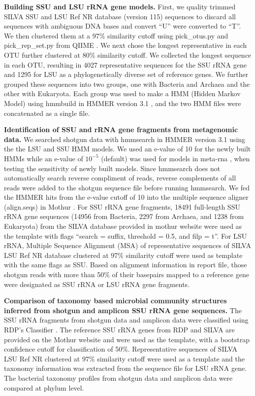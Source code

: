 \documentclass[12pt]{article}
\begin{document}
{\bf Building SSU and LSU rRNA gene models.} First, we quality
trimmed SILVA
\cite{silva2013} SSU and LSU Ref NR database (version 115) sequences
to discard all sequences with ambiguous DNA bases and convert
 ``U'' were converted to ``T''.  We then clustered them at a 97\%
similarity cutoff using pick\_otus.py and pick\_rep\_set.py from
QIIME \cite{qiime}. We next chose the longest representative in each OTU 
further clustered at 80\% similarity cutoff. We collected the longest
sequence in each OTU, resulting in 4027 representative
sequences for the SSU rRNA gene and 1295 for LSU as a phylogenetically
diverse set of reference genes. We further grouped these sequences
into two groups, one with Bacteria and Archaea and the other with
Eukaryota. Each group was used to make a HMM (Hidden Markov
Model) using hmmbuild in HMMER version 3.1 \cite{hmmer3}, and the two HMM
files were concatenated as a single file.

{\bf Identification of SSU and rRNA gene fragments from metagenomic
data.} We searched shotgun data with hmmsearch in HMMER version 3.1
\cite{hmmer3} using the the LSU and SSU HMM models. We used an e-value
of 10 for the newly built HMMs while an e-value of $10^{-5}$ (default)
was used for models in meta-rna \cite{metarna}, when testing the
sensitivity of newly built models. Since hmmsearch does not
automatically search reverse compliment of reads, reverse complements
of all reads were added to the shotgun sequence file before running
hmmsearch. We fed the HMMER hits from the e-value cutoff of 10 into
the multiple sequence aligner (align.seqs) in Mothur
\cite{mothuraligner2009}. For SSU rRNA gene fragments, 18491
full-length SSU rRNA gene sequences (14956 from Bacteria, 2297 from
Archaea, and 1238 from Eukaryota) from the SILVA database
\cite{silva2013} provided in mothur website were used as the template
with flags ``search = suffix, threshold = 0.5, and filp = t''.  For
LSU rRNA, Multiple Sequence Alignment (MSA) of representative
sequences of SILVA LSU Ref NR database clustered at 97\% similarity
cutoff were used as template with the same flags as SSU. Based on
alignment information in report file, those shotgun reads with more
than 50\% of their basepairs mapped to a reference gene were
designated as SSU rRNA or LSU rRNA gene fragments.

{\bf Comparison of taxonomy based microbial community structures
inferred from shotgun and amplicon SSU rRNA gene sequences.} The SSU
rRNA fragments from shotgun data and amplicon data were classified
using RDP's Classifier \cite{rdpclassifier}. The reference SSU rRNA
genes from RDP and SILVA are provided on the Mothur website and were
used as the template, with a bootstrap confidence cutoff for
classification of 50\%. Representative sequences of SILVA LSU Ref NR
clustered at 97\% similarity cutoff were used as a template and the
taxonomy information was extracted from the sequence file for LSU rRNA
gene. The bacterial taxonomy profiles from shotgun data and amplicon
data were compared at phylum level.
\end{document}
